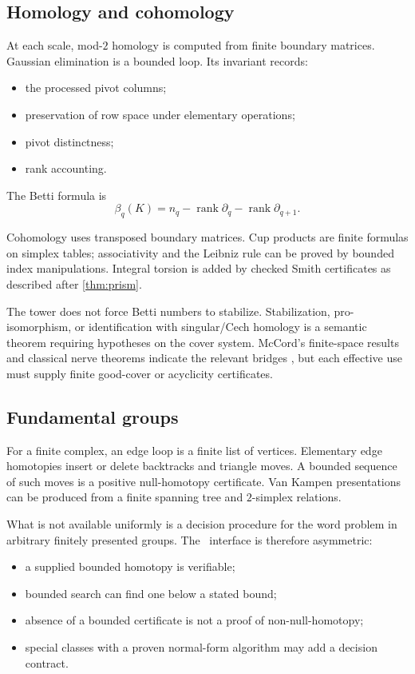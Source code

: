 \subsection{Homology and cohomology}

At each scale, mod-$2$ homology is computed from finite boundary matrices.  Gaussian elimination is a bounded loop.  Its invariant records:
\begin{itemize}
  \item the processed pivot columns;
  \item preservation of row space under elementary operations;
  \item pivot distinctness;
  \item rank accounting.
\end{itemize}
The Betti formula is
\[
  \beta_q(K)=n_q-\operatorname{rank}\partial_q-
  \operatorname{rank}\partial_{q+1}.
\]

Cohomology uses transposed boundary matrices.  Cup products are finite formulas on simplex tables; associativity and the Leibniz rule can be proved by bounded index manipulations.  Integral torsion is added by checked Smith certificates as described after \cref{thm:prism}.

The tower does not force Betti numbers to stabilize.  Stabilization, pro-isomorphism, or identification with singular/Cech homology is a semantic theorem requiring hypotheses on the cover system.  McCord's finite-space results and classical nerve theorems indicate the relevant bridges \cite{McCord1966}, but each effective use must supply finite good-cover or acyclicity certificates.

\subsection{Fundamental groups}

For a finite complex, an edge loop is a finite list of vertices.  Elementary edge homotopies insert or delete backtracks and triangle moves.  A bounded sequence of such moves is a positive null-homotopy certificate.  Van Kampen presentations can be produced from a finite spanning tree and $2$-simplex relations.

What is not available uniformly is a decision procedure for the word problem in arbitrary finitely presented groups.  The \ipra\ interface is therefore asymmetric:
\begin{itemize}
  \item a supplied bounded homotopy is verifiable;
  \item bounded search can find one below a stated bound;
  \item absence of a bounded certificate is not a proof of non-null-homotopy;
  \item special classes with a proven normal-form algorithm may add a decision contract.
\end{itemize}

